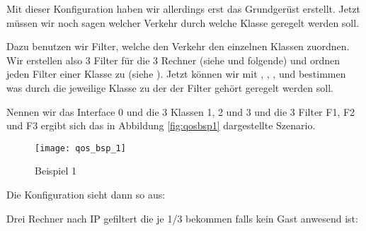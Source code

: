    Mit dieser Konfiguration haben wir allerdings erst das Grundgerüst
   erstellt. Jetzt müssen wir noch sagen welcher Verkehr durch welche
   Klasse geregelt werden soll.

   Dazu benutzen wir Filter, welche den Verkehr den einzelnen Klassen
   zuordnen.
   Wir erstellen also 3 Filter für die 3 Rechner (siehe
    und folgende) und ordnen jeden Filter einer Klasse zu
   (siehe ). Jetzt können wir mit
   , ,
   ,  und
    bestimmen was durch die jeweilige Klasse zu
   der der Filter gehört geregelt werden soll.

   Nennen wir das Interface 0 und die 3 Klassen 1, 2 und 3 und die 3
   Filter F1, F2 und F3 ergibt sich das in Abbildung \ref{fig:qosbsp1}
   dargestellte Szenario.

   \begin{figure}[htbp]
     \centering
     \texttt{[image: qos\_bsp\_1]}
     \caption{Beispiel 1}
   \end{figure}


   Die Konfiguration sieht dann so aus:

   Drei Rechner nach IP gefiltert die je 1/3 bekommen falls kein Gast
   anwesend ist:

